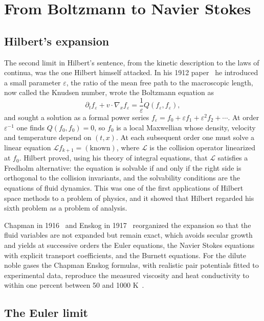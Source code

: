 \chapter{From Boltzmann to Navier Stokes}
\label{ch:hydro}

\section{Hilbert's expansion}

The second limit in Hilbert's sentence, from the kinetic description to the laws of continua, was the one Hilbert himself attacked. In his 1912 paper~\cite{hilbert1912} he introduced a small parameter $\varepsilon$, the ratio of the mean free path to the macroscopic length, now called the Knudsen number, wrote the Boltzmann equation as
\[
\partial_tf_\varepsilon+v\cdot\nabla_xf_\varepsilon = \frac1\varepsilon Q(f_\varepsilon,f_\varepsilon),
\]
and sought a solution as a formal power series $f_\varepsilon = f_0+\varepsilon f_1+\varepsilon^2f_2+\cdots$. At order $\varepsilon^{-1}$ one finds $Q(f_0,f_0) = 0$, so $f_0$ is a local Maxwellian whose density, velocity and temperature depend on $(t,x)$. At each subsequent order one must solve a linear equation $\mathcal{L}f_{k+1} = (\text{known})$, where $\mathcal{L}$ is the collision operator linearized at $f_0$. Hilbert proved, using his theory of integral equations, that $\mathcal{L}$ satisfies a Fredholm alternative: the equation is solvable if and only if the right side is orthogonal to the collision invariants, and the solvability conditions are the equations of fluid dynamics. This was one of the first applications of Hilbert space methods to a problem of physics, and it showed that Hilbert regarded his sixth problem as a problem of analysis.

Chapman in 1916~\cite{chapman1916} and Enskog in 1917~\cite{enskog1917} reorganized the expansion so that the fluid variables are not expanded but remain exact, which avoids secular growth and yields at successive orders the Euler equations, the Navier Stokes equations with explicit transport coefficients, and the Burnett equations. For the dilute noble gases the Chapman Enskog formulas, with realistic pair potentials fitted to experimental data, reproduce the measured viscosity and heat conductivity to within one percent between 50 and 1000 K~\cite{kestin1984}.

\section{The Euler limit}

